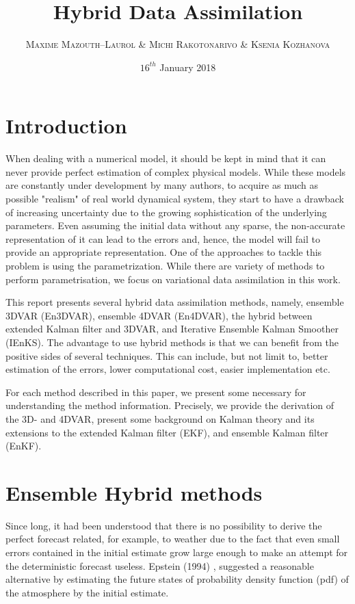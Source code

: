 \documentclass[a4,12pt]{article}
\title{\textbf{Hybrid Data Assimilation}}
\author{
\begin{tabular}{cc}
	\textsc{Maxime Mazouth--Laurol} \& \textsc{Michi Rakotonarivo} \& \textsc{Ksenia Kozhanova}
\end{tabular}}
\date{\small $16^{th}$ January 2018}
\numberwithin{equation}{section}
\begin{document}
\maketitle

\section{Introduction}
When dealing with a numerical model, it should be kept in mind that it can never provide perfect estimation of complex physical models. While these models are constantly under development by many authors, to acquire as much as possible "realism" of real world dynamical system, they start to have a drawback of increasing uncertainty due to the growing sophistication of the underlying parameters. Even assuming the initial data without any sparse, the non-accurate representation of it can lead to the errors and, hence, the model will fail to provide an appropriate representation. One of the approaches to tackle this problem is using the parametrization. While there are variety of methods to perform parametrisation, we focus on variational data assimilation in this work.

This report presents several hybrid data assimilation methods, namely, ensemble 3DVAR (En3DVAR), ensemble 4DVAR (En4DVAR), the hybrid between extended Kalman filter and 3DVAR, and  Iterative Ensemble Kalman Smoother (IEnKS). The advantage to use hybrid methods is that we can benefit from the positive sides of several techniques. This can include, but not limit to, better estimation of the errors, lower computational cost, easier implementation etc. 

For each method described in this paper, we present some necessary for understanding the method information. Precisely, we provide the derivation of the 3D- and 4DVAR, present some background on Kalman theory and its extensions to the extended Kalman filter (EKF), and ensemble Kalman filter (EnKF).

\section{Ensemble Hybrid methods}

Since long, it had been understood that there is no possibility to derive the perfect forecast related, for example, to weather due to the fact that even small errors contained in the initial estimate grow large enough to make an attempt for the deterministic forecast useless. Epstein (1994) \cite{evensen}, suggested a reasonable alternative by estimating the future states of probability density function (pdf)  of the atmosphere by the initial estimate.
\end{document}
